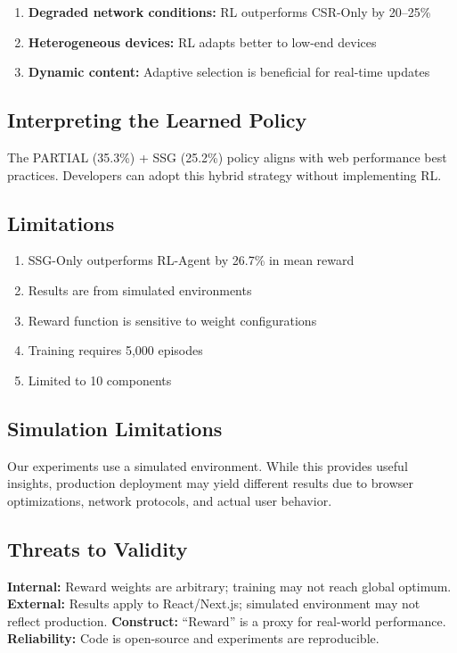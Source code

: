 \documentclass[10pt,twocolumn]{article}
\begin{document}
\begin{enumerate}[nosep]
\item \textbf{Degraded network conditions:} RL outperforms CSR-Only by 20--25\%
\item \textbf{Heterogeneous devices:} RL adapts better to low-end devices
\item \textbf{Dynamic content:} Adaptive selection is beneficial for real-time updates
\end{enumerate}

\subsection{Interpreting the Learned Policy}

The PARTIAL (35.3\%) + SSG (25.2\%) policy aligns with web performance best practices. Developers can adopt this hybrid strategy without implementing RL.

\subsection{Limitations}

\begin{enumerate}[nosep]
\item SSG-Only outperforms RL-Agent by 26.7\% in mean reward
\item Results are from simulated environments
\item Reward function is sensitive to weight configurations
\item Training requires 5,000 episodes
\item Limited to 10 components
\end{enumerate}

\subsection{Simulation Limitations}

Our experiments use a simulated environment. While this provides useful insights, production deployment may yield different results due to browser optimizations, network protocols, and actual user behavior.

\subsection{Threats to Validity}

\textbf{Internal:} Reward weights are arbitrary; training may not reach global optimum. \textbf{External:} Results apply to React/Next.js; simulated environment may not reflect production. \textbf{Construct:} ``Reward'' is a proxy for real-world performance. \textbf{Reliability:} Code is open-source and experiments are reproducible.
\end{document}
